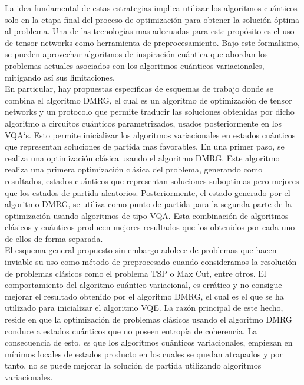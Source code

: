 \newpage

La idea fundamental de estas estrategias implica utilizar los algoritmos cuánticos solo en la etapa final del proceso de optimización para obtener la solución óptima al problema. Una de las tecnologías mas adecuadas para este propósito es el uso de tensor networks como herramienta de preprocesamiento. Bajo este formalismo, se pueden aprovechar algoritmos de inspiración cuántica que abordan los problemas actuales asociados con los algoritmos cuánticos variacionales, mitigando así sus limitaciones. \\


En particular, hay propuestas especificas de esquemas de trabajo donde se combina el algoritmo DMRG, el cual es un algoritmo de optimización de tensor networks y un protocolo que permite traducir las soluciones obtenidas por dicho algoritmo a circuitos cuánticos parametrizados, usados posteriormente en los VQA`s. Esto permite inicializar los algoritmos variacionales en estados cuánticos que representan soluciones de partida mas favorables. En una primer paso, se realiza una optimización clásica usando el algoritmo DMRG. Este algoritmo realiza una primera optimización clásica del problema, generando como resultados, estados cuánticos que representan soluciones suboptimas pero mejores que los estados de partida aleatorios. Posteriormente, el estado generado por el algoritmo DMRG, se utiliza como punto de partida para la segunda parte de la optimización usando algoritmos de tipo VQA. Esta combinación de algoritmos clásicos y cuánticos producen mejores resultados que los obtenidos por cada uno de ellos de forma separada. \\

El esquema general propuesto sin embargo adolece de problemas que hacen inviable su uso como método de preprocesado cuando consideramos la resolución de problemas clásicos como el problema TSP o Max Cut, entre otros. El comportamiento del algoritmo cuántico variacional, es errático y no consigue mejorar el resultado obtenido por el algoritmo DMRG, el cual es el que se ha utilizado para inicializar el algoritmo VQE. La razón principal de este hecho, reside en que la optimización de problemas clásicos usando el algoritmo DMRG conduce a estados cuánticos que no poseen entropía de coherencia. La consecuencia de esto, es que los algoritmos cuánticos variacionales, empiezan en mínimos locales de estados producto en los cuales se quedan atrapados y por tanto, no se puede mejorar la solución de partida utilizando algoritmos variacionales. 

